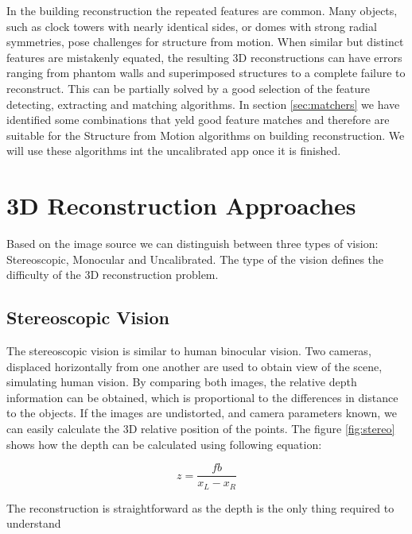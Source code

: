 In the building reconstruction the repeated features are common. Many objects, such as clock towers with nearly identical sides, or domes with strong radial symmetries, pose challenges for structure from motion. When similar but distinct features are mistakenly equated, the resulting 3D reconstructions can have errors ranging from phantom walls and superimposed structures to a complete failure to reconstruct. This can be partially solved by a good selection of the feature detecting, extracting and matching algorithms. In section \ref{sec:matchers} we have identified some combinations that yeld good feature matches and therefore are suitable for the Structure from Motion algorithms on building reconstruction. We will use these algorithms int the uncalibrated app once it is finished.

\section{3D Reconstruction Approaches}
Based on the image source we can distinguish between three types of vision: Stereoscopic, Monocular and Uncalibrated. The type of the vision defines the difficulty of the 3D reconstruction problem.

\subsection*{Stereoscopic Vision}
The stereoscopic vision is similar to human binocular vision. Two cameras, displaced horizontally from one another are used to obtain view of the scene, simulating human vision. By comparing both images, the relative depth information can be obtained, which is proportional to the differences in distance to the objects. If the images are undistorted, and camera parameters known, we can easily calculate the 3D relative position of the points. The figure \ref{fig:stereo} shows how the depth can be calculated using following equation:

\begin{equation}
	z=\frac{f b}{x_L - x_R}
\end{equation}

The reconstruction is straightforward as the depth is the only thing required to understand

